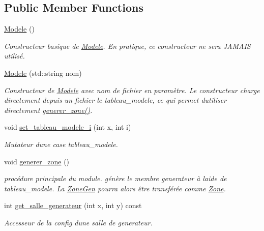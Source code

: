 \subsection*{Public Member Functions}
\begin{DoxyCompactItemize}
\item 
\hyperlink{classModele_ae9d6a289deaebe7e8eeda46693d79d23}{Modele} ()
\begin{DoxyCompactList}\small\item\em Constructeur basique de \hyperlink{classModele}{Modele}. En pratique, ce constructeur ne sera J\+A\+M\+A\+IS utilisé. \end{DoxyCompactList}\item 
\hyperlink{classModele_a14085f4c7825d488f349f262dcc35d13}{Modele} (std\+::string nom)
\begin{DoxyCompactList}\small\item\em Constructeur de \hyperlink{classModele}{Modele} avec nom de fichier en paramètre. Le constructeur charge directement depuis un fichier le {\itshape tableau\+\_\+modele}, ce qui permet d\textquotesingle{}utiliser directement \hyperlink{classModele_aa7d12b096f73bd3cbd25f6ca8ba64662}{generer\+\_\+zone()}. \end{DoxyCompactList}\item 
void \hyperlink{classModele_a8092dd958959388cc830123a2af32d85}{set\+\_\+tableau\+\_\+modele\+\_\+i} (int x, int i)
\begin{DoxyCompactList}\small\item\em Mutateur d\textquotesingle{}une case tableau\+\_\+modele. \end{DoxyCompactList}\item 
void \hyperlink{classModele_aa7d12b096f73bd3cbd25f6ca8ba64662}{generer\+\_\+zone} ()
\begin{DoxyCompactList}\small\item\em procédure principale du module. génère le membre {\itshape generateur} à l\textquotesingle{}aide de {\itshape tableau\+\_\+modele}. La \hyperlink{classZoneGen}{Zone\+Gen} pourra alors être transférée comme \hyperlink{classZone}{Zone}. \end{DoxyCompactList}\item 
int \hyperlink{classModele_a773443b469f018fadc373423912c7eee}{get\+\_\+salle\+\_\+generateur} (int x, int y) const 
\begin{DoxyCompactList}\small\item\em Accesseur de la config d\textquotesingle{}une \textquotesingle{}salle\textquotesingle{} de {\itshape generateur}. \end{DoxyCompactList}\item 

\end{DoxyCompactItemize}

